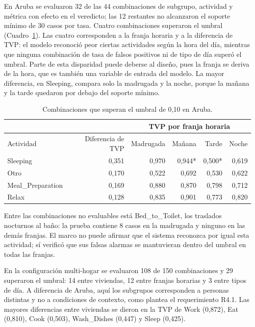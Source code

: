 En Aruba se evaluaron 32 de las 44 combinaciones de subgrupo, actividad y
métrica con efecto en el veredicto; las 12 restantes no alcanzaron el soporte
mínimo de 30 casos por tasa. Cuatro combinaciones superaron el umbral
(Cuadro~\ref{cuadro:aruba}). Las cuatro corresponden a la franja horaria y a la
diferencia de TVP: el modelo reconoció peor ciertas actividades según la hora
del día, mientras que ninguna combinación de tasa de falsos positivos ni de tipo
de día superó el umbral. Parte de esta disparidad puede deberse al diseño, pues
la franja se deriva de la hora, que es también una variable de entrada del
modelo. La mayor diferencia, en Sleeping, compara solo la madrugada y la noche,
porque la mañana y la tarde quedaron por debajo del soporte mínimo.

\begin{table}[htbp]
  \caption{Combinaciones que superan el umbral de 0,10 en Aruba.}
  \label{cuadro:aruba}
  \small
  \begin{tabularx}{\linewidth}{@{}>{\raggedright\arraybackslash}X*{5}{r}@{}}
    \toprule
    & & \multicolumn{4}{c}{TVP por franja horaria} \\
    \cmidrule(l){3-6}
    Actividad & Diferencia de TVP & Madrugada & Mañana & Tarde & Noche \\
    \midrule
    Sleeping         & 0,351 & 0,970 & 0,944* & 0,500* & 0,619 \\
    Otro             & 0,170 & 0,522 & 0,692  & 0,530  & 0,622 \\
    Meal\_Preparation & 0,169 & 0,880 & 0,870  & 0,798  & 0,712 \\
    Relax            & 0,128 & 0,835 & 0,901  & 0,773  & 0,820 \\
    \bottomrule
  \end{tabularx}
  \par{}
\end{table}

Entre las combinaciones no evaluables está Bed\_to\_Toilet, los traslados
nocturnos al baño: la prueba contiene 8 casos en la madrugada y ninguno en las
demás franjas. El marco no puede afirmar que el sistema reconozca por igual
esta actividad; sí verificó que sus falsas alarmas se mantuvieran dentro del
umbral en todas las franjas.

En la configuración multi-hogar se evaluaron 108 de 150 combinaciones y 29
superaron el umbral: 14 entre viviendas, 12 entre franjas horarias y 3 entre
tipos de día. A diferencia de Aruba, aquí los subgrupos corresponden a personas
distintas y no a condiciones de contexto, como plantea el requerimiento R4.1.
Las mayores diferencias entre viviendas se dieron en la TVP de Work (0,872),
Eat (0,810), Cook (0,503), Wash\_Dishes (0,447) y Sleep (0,425).

